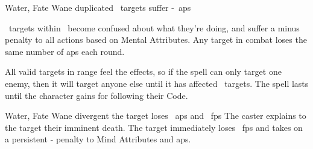  {Water, Fate}%
  {Wane}%
  {duplicated}%
  {}%
  {\spellArea\ targets suffer -~\glspl{ap}}%
  {
    \spellArea\ targets within \spellRange\ become confused about what they're doing, and suffer a minus  penalty to all actions based on Mental Attributes.
    Any target in combat loses the same number of \glspl{ap} each round.

    All valid targets in range feel the effects, so if the spell can only target one enemy, then it will target anyone else until it has affected \spellArea\ targets.
    The spell lasts until the character gains  for following their Code.
  }

  {Water, Fate}%
  {Wane}%
  {divergent}%
  {}%
  {the target loses ~\glspl{ap} and \showDam~\glspl{fp}}%
  {
    The caster explains to the target their imminent death.
    The target immediately loses \showDam\ \glspl{fp} and takes on a persistent - penalty to Mind Attributes and \glspl{ap}.
  }
